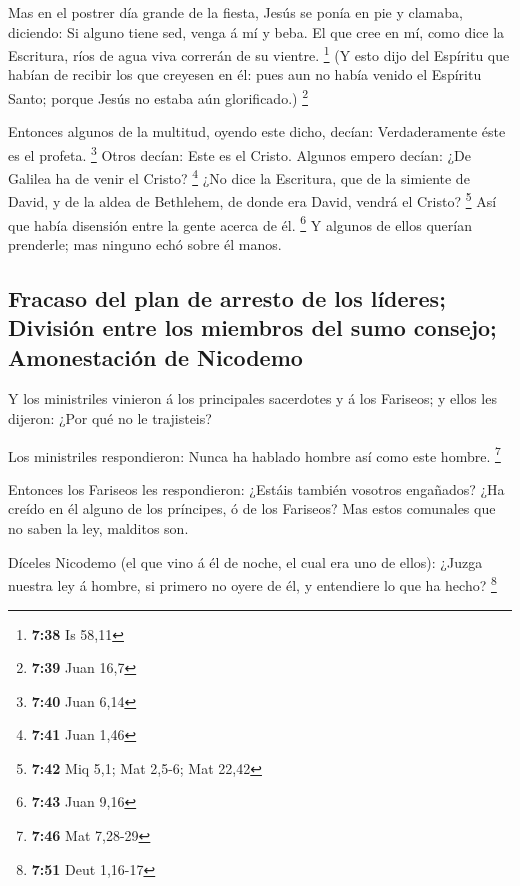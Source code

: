  Mas en el postrer día grande de la fiesta, Jesús se
ponía en pie y clamaba, diciendo: Si alguno tiene sed, venga á mí y
beba.  El que cree en mí, como dice la Escritura, ríos de
agua viva correrán de su vientre. \footnote{\textbf{7:38} Is 58,11}
 (Y esto dijo del Espíritu que habían de recibir los que
creyesen en él: pues aun no había venido el Espíritu Santo; porque Jesús
no estaba aún glorificado.) \footnote{\textbf{7:39} Juan 16,7}

 Entonces algunos de la multitud, oyendo este dicho,
decían: Verdaderamente éste es el profeta. \footnote{\textbf{7:40} Juan
  6,14}  Otros decían: Este es el Cristo. Algunos empero
decían: ¿De Galilea ha de venir el Cristo? \footnote{\textbf{7:41} Juan
  1,46}  ¿No dice la Escritura, que de la simiente de
David, y de la aldea de Bethlehem, de donde era David, vendrá el Cristo?
\footnote{\textbf{7:42} Miq 5,1; Mat 2,5-6; Mat 22,42} 
Así que había disensión entre la gente acerca de él. \footnote{\textbf{7:43}
  Juan 9,16}  Y algunos de ellos querían prenderle; mas
ninguno echó sobre él manos.

\hypertarget{fracaso-del-plan-de-arresto-de-los-luxedderes-divisiuxf3n-entre-los-miembros-del-sumo-consejo-amonestaciuxf3n-de-nicodemo}{%
\subsection{Fracaso del plan de arresto de los líderes; División entre
los miembros del sumo consejo; Amonestación de
Nicodemo}\label{fracaso-del-plan-de-arresto-de-los-luxedderes-divisiuxf3n-entre-los-miembros-del-sumo-consejo-amonestaciuxf3n-de-nicodemo}}

 Y los ministriles vinieron á los principales sacerdotes
y á los Fariseos; y ellos les dijeron: ¿Por qué no le trajisteis?

 Los ministriles respondieron: Nunca ha hablado hombre
así como este hombre. \footnote{\textbf{7:46} Mat 7,28-29}

 Entonces los Fariseos les respondieron: ¿Estáis también
vosotros engañados?  ¿Ha creído en él alguno de los
príncipes, ó de los Fariseos?  Mas estos comunales que no
saben la ley, malditos son.

 Díceles Nicodemo (el que vino á él de noche, el cual era
uno de ellos):  ¿Juzga nuestra ley á hombre, si primero
no oyere de él, y entendiere lo que ha hecho? \footnote{\textbf{7:51}
  Deut 1,16-17}

